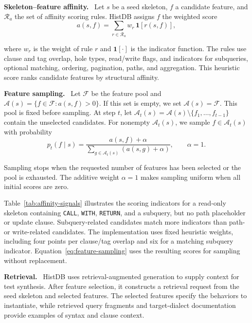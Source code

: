 \documentclass[acmsmall,screen,anonymous]{acmart}
\newcommand{\cnpara}[1]{\par\noindent\textbf{#1.}\ }
\begin{document}
\cnpara{Skeleton--feature affinity}
Let $s$ be a seed skeleton, $f$ a candidate feature, and $\mathcal{R}_a$ the set of affinity scoring rules. HistDB assigns $f$ the weighted score
\begin{equation}
a(s,f)=\sum_{r\in\mathcal{R}_a} w_r\,\mathbf{1}[r(s,f)],
\label{eq:skeleton-feature-affinity}
\end{equation}

where $w_r$ is the weight of rule $r$ and $\mathbf{1}[\cdot]$ is the indicator function. The rules use clause and tag overlap, hole types, read/write flags, and indicators for subqueries, optional matching, ordering, pagination, paths, and aggregation. This heuristic score ranks candidate features by structural affinity.

\cnpara{Feature sampling}
Let $\mathcal{F}$ be the feature pool and $\mathcal{A}(s)=\{f\in\mathcal{F}:a(s,f)>0\}$. If this set is empty, we set $\mathcal{A}(s)=\mathcal{F}$. This pool is fixed before sampling. At step $t$, let $\mathcal{A}_t(s)=\mathcal{A}(s)\setminus\{f_1,\ldots,f_{t-1}\}$ contain the unselected candidates. For nonempty $\mathcal{A}_t(s)$, we sample $f\in\mathcal{A}_t(s)$ with probability
\begin{equation}
p_t(f\mid s)=
\frac{a(s,f)+\alpha}
{\sum_{g\in\mathcal{A}_t(s)}\left(a(s,g)+\alpha\right)},
\qquad \alpha=1.
\label{eq:feature-sampling}
\end{equation}

Sampling stops when the requested number of features has been selected or the pool is exhausted. The additive weight $\alpha=1$ makes sampling uniform when all initial scores are zero.

\begin{table}[htbp]

\end{table}


Table~\ref{tab:affinity-signals} illustrates the scoring indicators for a read-only skeleton containing \lstinline|CALL|, \lstinline|WITH|, \lstinline|RETURN|, and a subquery, but no path placeholder or update clause. Subquery-related candidates match more indicators than path- or write-related candidates. The implementation uses fixed heuristic weights, including four points per clause/tag overlap and six for a matching subquery indicator. Equation~\ref{eq:feature-sampling} uses the resulting scores for sampling without replacement.



\cnpara{Retrieval}
HistDB uses retrieval-augmented generation \cite{ref11} to supply context for test synthesis. After feature selection, it constructs a retrieval request from the seed skeleton and selected features. The selected features specify the behaviors to instantiate, while retrieved query fragments and target-dialect documentation provide examples of syntax and clause context.
\end{document}
